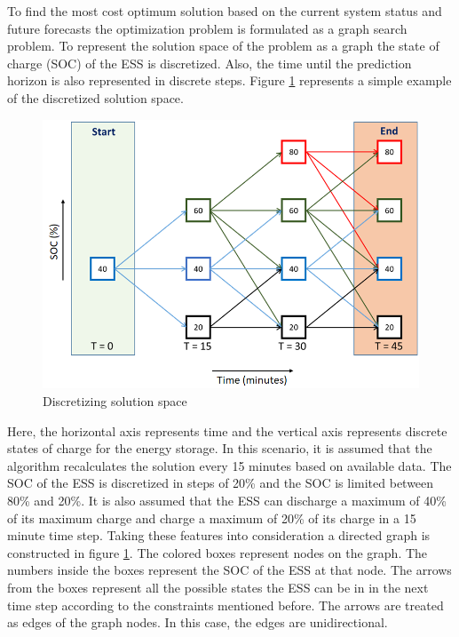 To find the most cost optimum solution based on the current system status and future forecasts the optimization problem is formulated as a graph search problem. To represent the solution space of the problem as a graph the state of charge (SOC) of the ESS is discretized. Also, the time until the prediction horizon is also represented in discrete steps. Figure \ref{fig:F1_Dis} represents a simple example of the discretized solution space.

\begin{figure}[!ht]
    \centering
    \includegraphics[width = \linewidth]{figs/F1_1_Dis.png}
    \caption{Discretizing solution space}
    \label{fig:F1_Dis}
\end{figure}
Here, the horizontal axis represents time and the vertical axis represents discrete states of charge for the energy storage. In this scenario, it is assumed that the algorithm recalculates the solution every 15 minutes based on available data. The SOC of the ESS is discretized in steps of 20\% and the SOC is limited between 80\% and 20\%. It is also assumed that the ESS can discharge a maximum of 40\% of its maximum charge and charge a maximum of 20\% of its charge in a 15 minute time step. Taking these features into consideration a directed graph is constructed in figure \ref{fig:F1_Dis}. The colored boxes represent nodes on the graph. The numbers inside the boxes represent the SOC of the ESS at that node. The arrows from the boxes represent all the possible states the ESS can be in in the next time step according to the constraints mentioned before. The arrows are treated as edges of the graph nodes. In this case, the edges are unidirectional.

